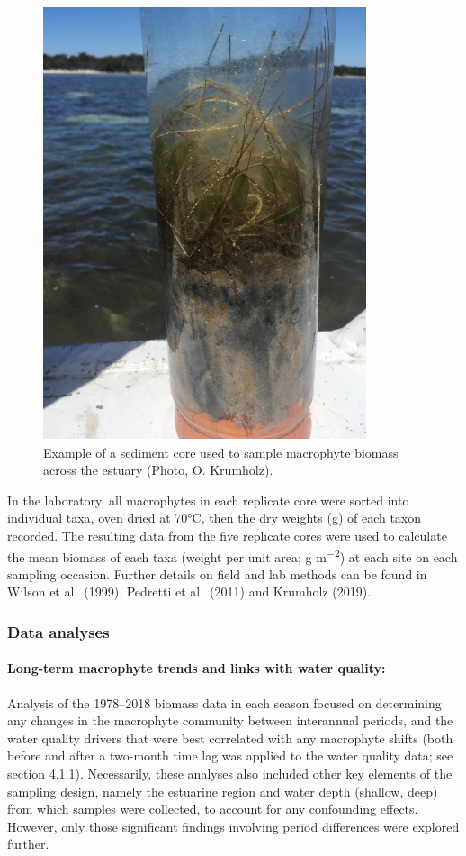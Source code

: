 \documentclass[
]{book}
\begin{document}
\begin{figure}
\includegraphics[width=0.5\linewidth]{images/macrophytes/picture5} \caption{Example of a sediment core used to sample macrophyte biomass across the estuary (Photo, O. Krumholz).}\label{fig:macrophytes-pic5}
\end{figure}

In the laboratory, all macrophytes in each replicate core were sorted into individual taxa, oven dried at 70°C, then the dry weights (g) of each taxon recorded. The resulting data from the five replicate cores were used to calculate the mean biomass of each taxa (weight per unit area; g m\textsuperscript{−2}) at each site on each sampling occasion. Further details on field and lab methods can be found in Wilson et al.~(1999), Pedretti et al.~(2011) and Krumholz (2019).

\hypertarget{data-analyses-1}{%
\subsubsection{Data analyses}\label{data-analyses-1}}

\hypertarget{long-term-macrophyte-trends-and-links-with-water-quality}{%
\paragraph{Long-term macrophyte trends and links with water quality:}\label{long-term-macrophyte-trends-and-links-with-water-quality}}

Analysis of the 1978--2018 biomass data in each season focused on determining any changes in the macrophyte community between interannual periods, and the water quality drivers that were best correlated with any macrophyte shifts (both before and after a two-month time lag was applied to the water quality data; see section 4.1.1). Necessarily, these analyses also included other key elements of the sampling design, namely the estuarine region and water depth (shallow, deep) from which samples were collected, to account for any confounding effects. However, only those significant findings involving period differences were explored further.
\end{document}
